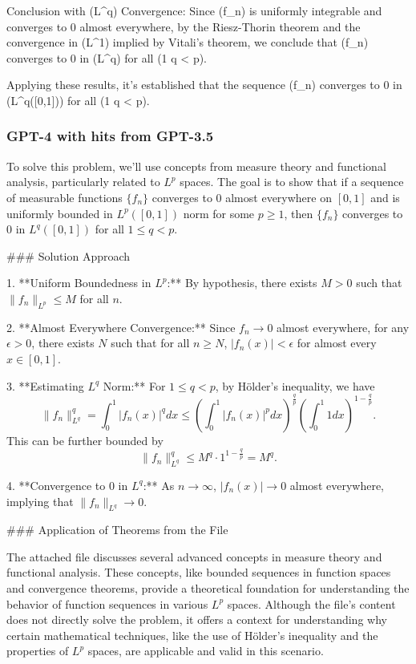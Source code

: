 \documentclass{article}
\begin{document}
Conclusion with (L^q) Convergence: Since ({f_n}) is uniformly integrable and converges to 0 almost everywhere, by the Riesz-Thorin theorem and the convergence in (L^1) implied by Vitali's theorem, we conclude that ({f_n}) converges to 0 in (L^q) for all (1 \leq q < p).

Applying these results, it's established that the sequence ({f_n}) converges to 0 in (L^q([0,1])) for all (1 \leq q < p).

\subsubsection{GPT-4 with hits from GPT-3.5}

To solve this problem, we'll use concepts from measure theory and functional analysis, particularly related to \(L^p\) spaces. The goal is to show that if a sequence of measurable functions \(\{f_n\}\) converges to 0 almost everywhere on \([0,1]\) and is uniformly bounded in \(L^p([0,1])\) norm for some \(p \geq 1\), then \(\{f_n\}\) converges to 0 in \(L^q([0,1])\) for all \(1 \leq q < p\).

### Solution Approach

1. **Uniform Boundedness in \(L^p\):** By hypothesis, there exists \(M > 0\) such that \(\|f_n\|_{L^p} \leq M\) for all \(n\).

2. **Almost Everywhere Convergence:** Since \(f_n \to 0\) almost everywhere, for any \(\epsilon > 0\), there exists \(N\) such that for all \(n \geq N\), \(|f_n(x)| < \epsilon\) for almost every \(x \in [0,1]\).

3. **Estimating \(L^q\) Norm:** For \(1 \leq q < p\), by Hölder's inequality, we have
   $$
   \|f_n\|_{L^q}^q = \int_0^1 |f_n(x)|^q dx \leq \left(\int_0^1 |f_n(x)|^p dx\right)^{\frac{q}{p}} \left(\int_0^1 1 dx\right)^{1-\frac{q}{p}}.
   $$
   This can be further bounded by
   $$
   \|f_n\|_{L^q}^q \leq M^q \cdot 1^{1-\frac{q}{p}} = M^q.
   $$

4. **Convergence to 0 in \(L^q\):** As \(n \to \infty\), \(|f_n(x)| \to 0\) almost everywhere, implying that \(\|f_n\|_{L^q} \to 0\).

### Application of Theorems from the File

The attached file discusses several advanced concepts in measure theory and functional analysis. These concepts, like bounded sequences in function spaces and convergence theorems, provide a theoretical foundation for understanding the behavior of function sequences in various \(L^p\) spaces. Although the file's content does not directly solve the problem, it offers a context for understanding why certain mathematical techniques, like the use of Hölder's inequality and the properties of \(L^p\) spaces, are applicable and valid in this scenario.
\end{document}
